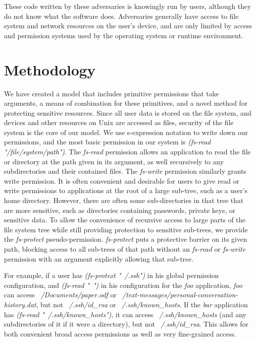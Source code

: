 These code written by these adversaries is knowingly run by users, although they do not know what the software does.  Adversaries generally have access to file system and network resources on the user's device, and are only limited by access and permission systems used by the operating system or runtime environment.

\section{Methodology}\label{section:methodology}
We have created a model that includes primitive permissions that take arguments, a means of combination for these primitives, and a novel method for protecting sensitive resources.
Since all user data is stored on the file system, and devices and other resources on Unix are accessed as files, security of the file system is the core of our model.
We use s-expression notation to write down our permissions, and the most basic permission in our system is \textit{(fs-read "/file/system/path")}.  
The \textit{fs-read} permission allows an application to read the file or directory at the path given in its argument, as well recursively to any subdirectories and their contained files.
The \textit{fs-write} permission similarly grants write permission.
It is often convenient and desirable for users to give read or write permissions to applications at the root of a large sub-tree, such as a user's home directory.  
However, there are often some sub-directories in that tree that are more sensitive, such as directories containing passwords, private keys, or sensitive data.
To allow the convenience of recursive access to large parts of the file system tree while still providing protection to sensitive sub-trees, we provide the \textit{fs-protect} pseudo-permission.
\textit{fs-protect} puts a protective barrier on its given path, blocking access to all sub-trees of that path without an \textit{fs-read} or \textit{fs-write} permission with an argument explicitly allowing that sub-tree.

For example, if a user has \textit{(fs-protext "~/.ssh")} in his global permission configuration, and \textit{(fs-read "~")} in his configuration for the \textit{foo} application, \textit{foo} can access \textit{~/Documents/paper.odf} or \textit{~/text-messages/personal-conversation-history.dat}, but not \textit{~/.ssh/id\_rsa} or \textit{~/.ssh/known\_hosts}.  
If the \textit{bar} application has \textit{(fs-read "~/.ssh/known\_hosts")}, it can access \textit{~/.ssh/known\_hosts} (and any subdirectories of it if it were a directory), but not \textit{~/.ssh/id\_rsa}.
This allows for both convenient broad access permissions as well as very fine-grained access.

